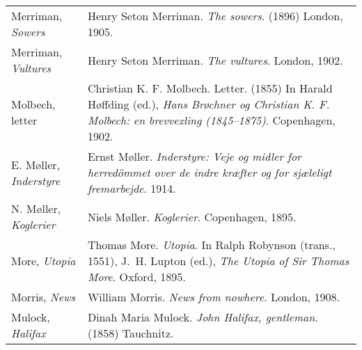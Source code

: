 \begin{longtable}{p{} p{}}
Merriman, \textit{Sowers} & Henry Seton Merriman. \textit{The sowers}. (1896) London, 1905. \\
Merriman, \textit{Vultures} & Henry Seton Merriman. \textit{The vultures}. London, 1902. \\
%

Molbech, letter & Christian K. F. Molbech. Letter. (1855) In Harald Høffding (ed.), \textit{Hans Brøchner og Christian K. F. Molbech: en brevvexling (1845--1875)}. Copenhagen, 1902. \\

E. Møller, \textit{Inderstyre} & Ernst Møller. \textit{Inderstyre: Veje og midler for herredömmet over de indre kræfter og for sjæleligt fremarbejde}. 1914. \\

N. Møller, \textit{Koglerier} & Niels Møller. \textit{Koglerier}. Copenhagen, 1895. \\

More, \textit{Utopia} & Thomas More. \textit{Utopia}. In Ralph Robynson (trans., 1551), J.~H. Lupton (ed.), \textit{The Utopia of Sir Thomas More}. Oxford, 1895. \\

Morris, \textit{News} & William Morris. \textit{News from nowhere}. London, 1908. \\

Mulock, \textit{Halifax} & Dinah Maria Mulock. \textit{John Halifax, gentleman}. (1858) Tauchnitz. \\


\end{longtable}

